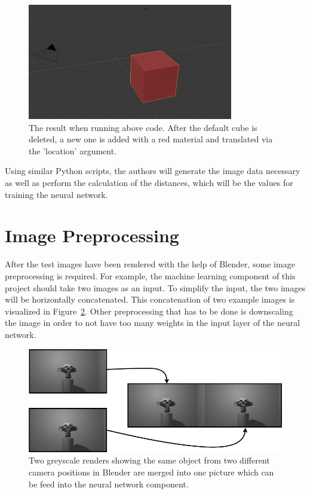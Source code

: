 \begin{figure}[h!]
	\centering
	\includegraphics[width=0.8\textwidth]{img/methodology_generatingData_blender_exampleScriptResult.png}
	\caption{The result when running above code. After the default cube is deleted, a new one is added with a red material and translated via the 'location' argument.}
	\label{pic:methodology_generatingData_blender_exampleScriptResult}
\end{figure}

Using similar Python scripts, the authors will generate the image data necessary as well as perform the calculation of the distances, which will be the values for training the neural network.

\section{Image Preprocessing}
After the test images have been rendered with the help of Blender, some image preprocessing is required. For example, the machine learning component of this project should take two images as an input. To simplify the input, the two images will be horizontally concatenated. This concatenation of two example images is visualized in Figure~\ref{pic:methodology_imagePreprocessing_imageMerge}. Other preprocessing that has to be done is downscaling the image in order to not have too many weights in the input layer of the neural network.

\begin{figure}[h!]
	\centering
	\includegraphics[width=6.5in]{img/methodology_imagePreprocessing_imageMerge.png}
	\caption{Two greyscale renders showing the same object from two different camera positions in Blender are merged into one picture which can be feed into the neural network component.}
	\label{pic:methodology_imagePreprocessing_imageMerge}
\end{figure}

